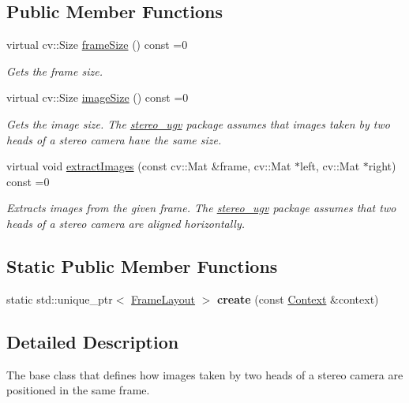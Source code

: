 \subsection*{Public Member Functions}
\begin{DoxyCompactItemize}
\item 
virtual cv\+::\+Size \hyperlink{classstereo__ugv_1_1FrameLayout_a59da4ac9d0cc6a43cccbf8666849bdc2}{frame\+Size} () const =0
\begin{DoxyCompactList}\small\item\em Gets the frame size. \end{DoxyCompactList}\item 
virtual cv\+::\+Size \hyperlink{classstereo__ugv_1_1FrameLayout_a12cc36a89f8e66ffc6a2fa5eb3c5f648}{image\+Size} () const =0
\begin{DoxyCompactList}\small\item\em Gets the image size. The \hyperlink{namespacestereo__ugv}{stereo\+\_\+ugv} package assumes that images taken by two heads of a stereo camera have the same size. \end{DoxyCompactList}\item 
virtual void \hyperlink{classstereo__ugv_1_1FrameLayout_af5ab49a35cfbb59a79863720e7985d29}{extract\+Images} (const cv\+::\+Mat \&frame, cv\+::\+Mat $\ast$left, cv\+::\+Mat $\ast$right) const =0
\begin{DoxyCompactList}\small\item\em Extracts images from the given frame. The \hyperlink{namespacestereo__ugv}{stereo\+\_\+ugv} package assumes that two heads of a stereo camera are aligned horizontally. \end{DoxyCompactList}\end{DoxyCompactItemize}
\subsection*{Static Public Member Functions}
\begin{DoxyCompactItemize}
\item 
\mbox{\label{classstereo__ugv_1_1FrameLayout_a438f24b40bcae9c0b115ba1285601481}} 
static std\+::unique\+\_\+ptr$<$ \hyperlink{classstereo__ugv_1_1FrameLayout}{Frame\+Layout} $>$ {\bfseries create} (const \hyperlink{classstereo__ugv_1_1Context}{Context} \&context)
\end{DoxyCompactItemize}


\subsection{Detailed Description}
The base class that defines how images taken by two heads of a stereo camera are positioned in the same frame. 

